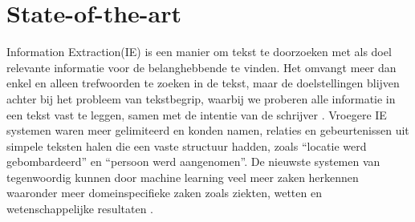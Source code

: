 
\section{State-of-the-art}%
\label{sec:state-of-the-art}

%
%
%
%
%
%

Information Extraction(IE) is een manier om tekst te doorzoeken met als doel relevante informatie voor de belanghebbende te vinden. Het omvangt meer dan enkel en alleen trefwoorden te zoeken in de tekst, maar de doelstellingen blijven achter bij het probleem van tekstbegrip, waarbij we proberen alle informatie in een tekst vast te leggen, samen met de intentie van de schrijver \autocite{hobbs2010}. Vroegere IE systemen waren meer gelimiteerd en konden namen, relaties en gebeurtenissen uit simpele teksten halen die een vaste structuur hadden, zoals ``locatie werd gebombardeerd'' en ``persoon werd aangenomen''. De nieuwste systemen van tegenwoordig kunnen door machine learning veel meer zaken herkennen waaronder meer domeinspecifieke zaken zoals ziekten, wetten en wetenschappelijke resultaten \autocite{Small2014}.

